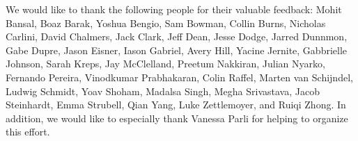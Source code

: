 \begin{acks}
We would like to thank the following people for their valuable feedback:
Mohit Bansal,
Boaz Barak,
Yoshua Bengio,
Sam Bowman,
Collin Burns,
Nicholas Carlini,
David Chalmers,
Jack Clark,
Jeff Dean,
Jesse Dodge,
Jarred Dunnmon,
Gabe Dupre,
Jason Eisner,
Iason Gabriel,
Avery Hill,
Yacine Jernite,
Gabbrielle Johnson,
Sarah Kreps,
Jay McClelland,
Preetum Nakkiran,
Julian Nyarko,
Fernando Pereira,
Vinodkumar Prabhakaran,
Colin Raffel,
Marten van Schijndel,
Ludwig Schmidt,
Yoav Shoham,
Madalsa Singh,
Megha Srivastava,
Jacob Steinhardt,
Emma Strubell,
Qian Yang,
Luke Zettlemoyer,
and
Ruiqi Zhong.
In addition, we would like to especially thank Vanessa Parli for helping to organize this effort.
\end{acks}